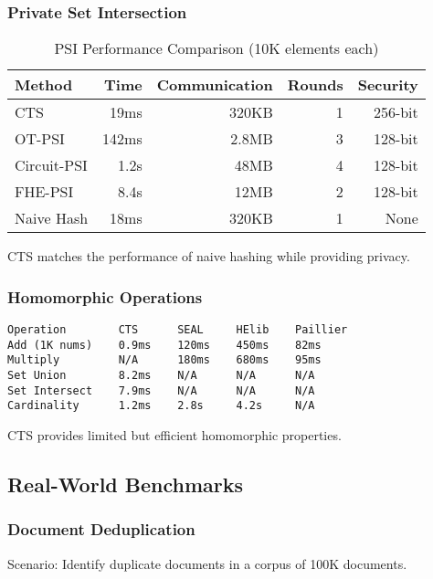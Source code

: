 \documentclass[../main_comprehensive.tex]{subfiles}
\begin{document}
\subsubsection{Private Set Intersection}

\begin{table}[h]
\centering
\caption{PSI Performance Comparison (10K elements each)}
\begin{tabular}{lrrrr}
\toprule
Method & Time & Communication & Rounds & Security \\
\midrule
CTS & 19ms & 320KB & 1 & 256-bit \\
OT-PSI & 142ms & 2.8MB & 3 & 128-bit \\
Circuit-PSI & 1.2s & 48MB & 4 & 128-bit \\
FHE-PSI & 8.4s & 12MB & 2 & 128-bit \\
Naive Hash & 18ms & 320KB & 1 & None \\
\bottomrule
\end{tabular}
\end{table}

CTS matches the performance of naive hashing while providing privacy.

\subsubsection{Homomorphic Operations}

\begin{lstlisting}[language={},basicstyle=\scriptsize\ttfamily,frame=single,caption={Homomorphic operation comparison}]
Operation        CTS      SEAL     HElib    Paillier
Add (1K nums)    0.9ms    120ms    450ms    82ms
Multiply         N/A      180ms    680ms    95ms
Set Union        8.2ms    N/A      N/A      N/A
Set Intersect    7.9ms    N/A      N/A      N/A
Cardinality      1.2ms    2.8s     4.2s     N/A
\end{lstlisting}

CTS provides limited but efficient homomorphic properties.

\subsection{Real-World Benchmarks}

\subsubsection{Document Deduplication}

Scenario: Identify duplicate documents in a corpus of 100K documents.
\end{document}
